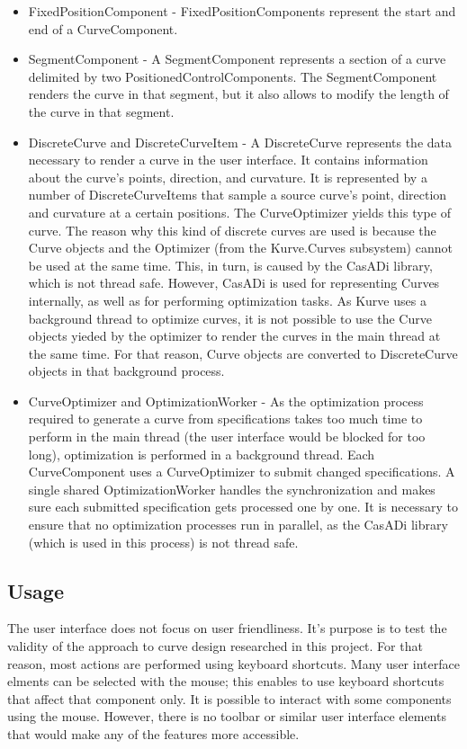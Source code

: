 \documentclass[a4paper]{article}
\begin{document}
\begin{itemize}
					\item FixedPositionComponent - FixedPositionComponents represent the start and end of a CurveComponent.
					\item SegmentComponent - A SegmentComponent represents a section of a curve delimited by two PositionedControlComponents. The SegmentComponent renders the curve in that segment, but it also allows to modify the length of the curve in that segment.
					\item DiscreteCurve and DiscreteCurveItem - A DiscreteCurve represents the data necessary to render a curve in the user interface. It contains information about the curve's points, direction, and curvature. It is represented by a number of DiscreteCurveItems that sample a source curve's point, direction and curvature at a certain positions. 
					The CurveOptimizer yields this type of curve. The reason why this kind of discrete curves are used is because the Curve objects and the Optimizer (from the Kurve.Curves subsystem) cannot be used at the same time. This, in turn, is caused by the CasADi library, which is not thread safe. However, CasADi is used for representing Curves internally, as well as for performing optimization tasks.
					As Kurve uses a background thread to optimize curves, it is not possible to use the Curve objects yieded by the optimizer to render the curves in the main thread at the same time. For that reason, Curve objects are converted to DiscreteCurve objects in that background process.
					\item CurveOptimizer and OptimizationWorker - As the optimization process required to generate a curve from specifications takes too much time to perform in the main thread (the user interface would be blocked for too long), optimization is performed in a background thread. Each CurveComponent uses a CurveOptimizer to submit changed specifications. A single shared OptimizationWorker handles the synchronization and makes sure each submitted specification gets processed one by one. It is necessary to ensure that no optimization processes run in parallel, as the CasADi library (which is used in this process) is not thread safe.
				\end{itemize}

			\subsection{Usage}
				
				The user interface does not focus on user friendliness. It's purpose is to test the validity of the approach to curve design researched in this project. For that reason, most actions are performed using keyboard shortcuts. Many user interface elments can be selected with the mouse; this enables to use keyboard shortcuts that affect that component only. It is possible to interact with some components using the mouse. However, there is no toolbar or similar user interface elements that would make any of the features more accessible.
				
\end{document}
